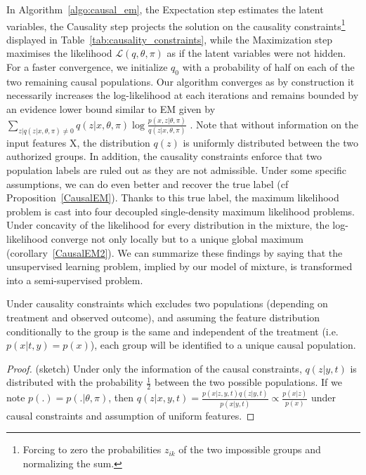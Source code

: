 In Algorithm~\ref{algo:causal_em}, the Expectation step estimates the latent variables, the Causality step projects the solution on the causality constraints\footnote{Forcing to zero the probabilities $z_{ik}$ of the  two impossible groups and normalizing the sum.}
displayed in Table~\ref{tab:causality_constraints}, while the Maximization step maximises the likelihood $\mathcal{L}(q,\theta,\pi)$ as if the latent variables were not hidden. For a faster convergence, we initialize $q_0$ with a probability of half on each of the two remaining causal populations.
Our algorithm converges as by construction it necessarily increases the log-likelihood at each iterations and remains bounded by an evidence lower bound similar to EM given by
$\sum_{z|q(z|x,\theta,\pi) \neq 0} q(z|x,\theta,\pi) \log \frac{p(x,z|\theta,\pi)}{q(z|x,\theta,\pi)}$ .
Note that without information on the input features X, the distribution $q(z)$ is uniformly distributed between the two authorized groups.
In addition, the causality constraints enforce that two population labels are ruled out as they are not admissible. Under some specific assumptions, we can do even better and recover the true label (cf Proposition~\ref{CausalEM}). Thanks to this true label, the maximum likelihood problem is cast into four decoupled single-density maximum likelihood problems.  Under concavity of the likelihood for every distribution in the mixture, the log-likelihood converge not only locally but to a unique global maximum (corollary~\ref{CausalEM2}). We can summarize these findings by saying that the unsupervised learning problem, implied by our model of mixture, is transformed into a semi-supervised problem.

\begin{proposition}\label{CausalEM} 
Under causality constraints which excludes two populations (depending on treatment and observed outcome), and assuming the feature distribution conditionally to the group is the same  and independent of the treatment (i.e. $p(x|t, y) = p(x)$), each group will be identified to a unique causal population.

\end{proposition}
\begin{proof} (sketch)
    Under only the information of the causal constraints, $q(z|y,t)$ is distributed with the probability $\frac{1}{2}$ between the two possible populations. If we note $p(.)=p(.|\theta,\pi)$, then 
    $q(z|x,y,t)=\frac{p(x|z,y,t)q(z|y,t)}{p(x|y,t)} \propto \frac{p(x|z)}{p(x)}$ under causal constraints and assumption of uniform features.
\end{proof}

